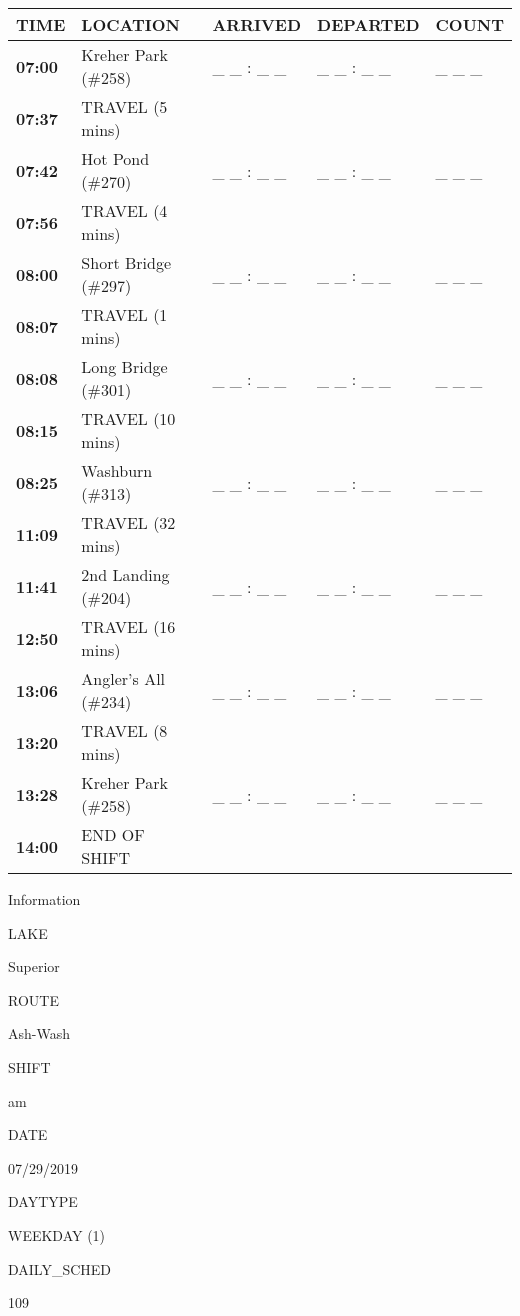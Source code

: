 \documentclass[]{article}
\begin{document}
\begin{tabular}{>{\bfseries}lllll}
\toprule
\textbf{TIME} & \textbf{LOCATION} & \textbf{ARRIVED} & \textbf{DEPARTED} & \textbf{COUNT}\\
\midrule
07:00 & Kreher Park (\#258) & \_ \_ : \_ \_ & \_ \_ : \_ \_ & \_ \_ \_\\
07:37 & TRAVEL (5 mins) &  &  & \\
07:42 & Hot Pond (\#270) & \_ \_ : \_ \_ & \_ \_ : \_ \_ & \_ \_ \_\\
07:56 & TRAVEL (4 mins) &  &  & \\
08:00 & Short Bridge (\#297) & \_ \_ : \_ \_ & \_ \_ : \_ \_ & \_ \_ \_\\
08:07 & TRAVEL (1 mins) &  &  & \\
08:08 & Long Bridge (\#301) & \_ \_ : \_ \_ & \_ \_ : \_ \_ & \_ \_ \_\\
08:15 & TRAVEL (10 mins) &  &  & \\
08:25 & Washburn (\#313) & \_ \_ : \_ \_ & \_ \_ : \_ \_ & \_ \_ \_\\
11:09 & TRAVEL (32 mins) &  &  & \\
11:41 & 2nd Landing (\#204) & \_ \_ : \_ \_ & \_ \_ : \_ \_ & \_ \_ \_\\
12:50 & TRAVEL (16 mins) &  &  & \\
13:06 & Angler's All (\#234) & \_ \_ : \_ \_ & \_ \_ : \_ \_ & \_ \_ \_\\
13:20 & TRAVEL (8 mins) &  &  & \\
13:28 & Kreher Park (\#258) & \_ \_ : \_ \_ & \_ \_ : \_ \_ & \_ \_ \_\\
14:00 & END OF SHIFT &  &  & \\
\bottomrule
\end{tabular}\newpage

Information

LAKE

Superior

ROUTE

Ash-Wash

SHIFT

am

DATE

07/29/2019

DAYTYPE

WEEKDAY (1)

DAILY\_SCHED

109

\vspace{24pt}
\end{document}
